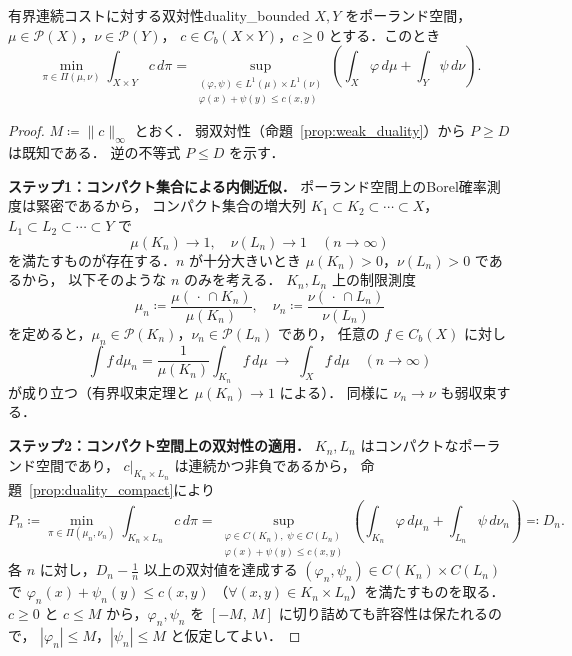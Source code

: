 \documentclass[uplatex, dvipdfmx]{jsarticle}
\begin{document}
\begin{proposition}{有界連続コストに対する双対性}{duality_bounded}
$X,Y$ をポーランド空間，$\mu\in\mathcal{P}(X)$，$\nu\in\mathcal{P}(Y)$，
$c\in C_b(X\times Y)$，$c\ge 0$ とする．このとき
\[
  \min_{\pi\in\Pi(\mu,\nu)}\int_{X\times Y} c\,d\pi
  = \sup_{\substack{(\varphi,\psi)\in L^1(\mu)\times L^1(\nu)\\
    \varphi(x)+\psi(y)\le c(x,y)}}
  \left(\int_X\varphi\,d\mu+\int_Y\psi\,d\nu\right).
\]
\end{proposition}

\begin{proof}
$M\coloneqq\|c\|_\infty$ とおく．
弱双対性（命題~\ref{prop:weak_duality}）から $P\ge D$ は既知である．
逆の不等式 $P\le D$ を示す．

\textbf{ステップ1：コンパクト集合による内側近似．}
ポーランド空間上のBorel確率測度は緊密であるから，
コンパクト集合の増大列 $K_1\subset K_2\subset\cdots\subset X$，
$L_1\subset L_2\subset\cdots\subset Y$ で
\[
  \mu(K_n)\to 1,\quad \nu(L_n)\to 1
  \quad (n\to\infty)
\]
を満たすものが存在する．$n$ が十分大きいとき $\mu(K_n)>0$，$\nu(L_n)>0$ であるから，
以下そのような $n$ のみを考える．
$K_n,L_n$ 上の制限測度
\[
  \mu_n\coloneqq\frac{\mu(\,\cdot\,\cap K_n)}{\mu(K_n)},\quad
  \nu_n\coloneqq\frac{\nu(\,\cdot\,\cap L_n)}{\nu(L_n)}
\]
を定めると，$\mu_n\in\mathcal{P}(K_n)$，$\nu_n\in\mathcal{P}(L_n)$ であり，
任意の $f\in C_b(X)$ に対し
\[
  \int f\,d\mu_n = \frac{1}{\mu(K_n)}\int_{K_n}f\,d\mu
  \;\to\; \int_X f\,d\mu
  \quad(n\to\infty)
\]
が成り立つ（有界収束定理と $\mu(K_n)\to 1$ による）．
同様に $\nu_n\to\nu$ も弱収束する．

\textbf{ステップ2：コンパクト空間上の双対性の適用．}
$K_n,L_n$ はコンパクトなポーランド空間であり，
$c|_{K_n\times L_n}$ は連続かつ非負であるから，
命題~\ref{prop:duality_compact}により
\[
  P_n \coloneqq \min_{\pi\in\Pi(\mu_n,\nu_n)}
    \int_{K_n\times L_n} c\,d\pi
  = \sup_{\substack{\varphi\in C(K_n),\;\psi\in C(L_n)\\
    \varphi(x)+\psi(y)\le c(x,y)}}
    \left(\int_{K_n}\varphi\,d\mu_n+\int_{L_n}\psi\,d\nu_n\right)
  \eqqcolon D_n.
\]
各 $n$ に対し，$D_n-\frac{1}{n}$ 以上の双対値を達成する
$(\varphi_n,\psi_n)\in C(K_n)\times C(L_n)$ で
$\varphi_n(x)+\psi_n(y)\le c(x,y)$
（$\forall (x,y)\in K_n\times L_n$）を満たすものを取る．
$c\ge 0$ と $c\le M$ から，$\varphi_n,\psi_n$ を
$[-M,\,M]$ に切り詰めても許容性は保たれるので，
$|\varphi_n|\le M$，$|\psi_n|\le M$ と仮定してよい．


\end{proof}
\end{document}
